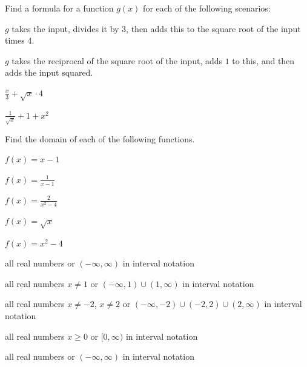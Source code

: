 \begin{exercise}
Find a formula for a function $g(x)$ for each of the following scenarios:


\begin{parts}
\item $g$ takes the input, divides it by 3, then adds this to the square root of the input times 4.
\item $g$ takes the reciprocal of the square root of the input, adds $1$ to this, and then adds the input squared.
\end{parts}
\end{exercise}


\begin{solution}

\begin{parts}
\item $\frac{x}{3} + \sqrt{x}\cdot 4$
\item $\frac{1}{\sqrt{x}}+1+x^2$
\end{parts}
\end{solution}





\begin{exercise}
Find the domain of each of the following functions.


\begin{parts}[itemsep=3pt]
\item $\displaystyle f(x)=x-1$
\item $\displaystyle f(x)=\frac{1}{x-1}$
\item $\displaystyle f(x)=\frac{2}{x^2-4}$
\item $\displaystyle f(x)=\sqrt{x}$
\item $\displaystyle f(x)=x^2-4$  
\end{parts}
\end{exercise}


\begin{solution}

\begin{parts}
\item all real numbers or $(-\infty,\infty)$ in interval notation
\item all real numbers $x\neq1$ or $(-\infty,1)\cup(1,\infty)$ in interval notation
\item all real numbers $x\neq-2$, $x\neq2$ or $(-\infty,-2)\cup(-2,2)\cup(2,\infty)$ in interval notation
\item all real numbers $x\geq0$ or $[0,\infty)$ in interval notation
\item all real numbers or $(-\infty,\infty)$ in interval notation
\end{parts}
\end{solution}







